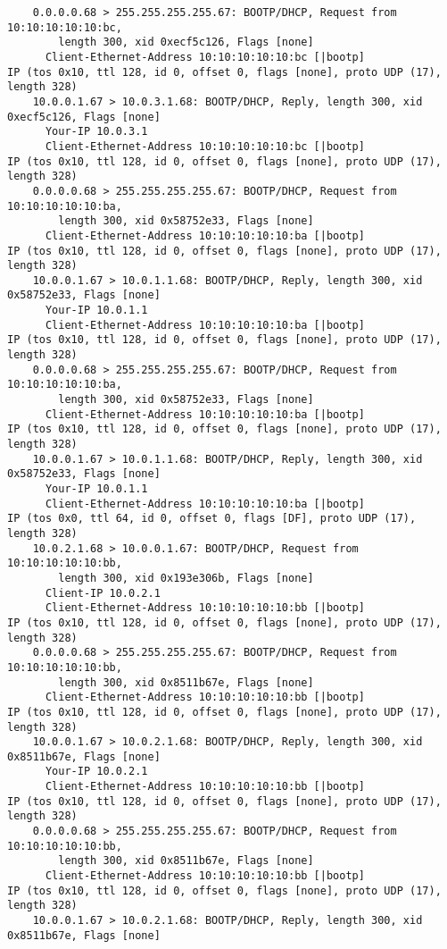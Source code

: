 \documentclass[a4paper,12pt]{article}
\begin{document}
\begin{Verbatim}
	0.0.0.0.68 > 255.255.255.255.67: BOOTP/DHCP, Request from 10:10:10:10:10:bc, 
		length 300, xid 0xecf5c126, Flags [none]
	  Client-Ethernet-Address 10:10:10:10:10:bc [|bootp]
IP (tos 0x10, ttl 128, id 0, offset 0, flags [none], proto UDP (17), length 328) 
	10.0.0.1.67 > 10.0.3.1.68: BOOTP/DHCP, Reply, length 300, xid 0xecf5c126, Flags [none]
	  Your-IP 10.0.3.1
	  Client-Ethernet-Address 10:10:10:10:10:bc [|bootp]
IP (tos 0x10, ttl 128, id 0, offset 0, flags [none], proto UDP (17), length 328) 
	0.0.0.0.68 > 255.255.255.255.67: BOOTP/DHCP, Request from 10:10:10:10:10:ba, 
		length 300, xid 0x58752e33, Flags [none]
	  Client-Ethernet-Address 10:10:10:10:10:ba [|bootp]
IP (tos 0x10, ttl 128, id 0, offset 0, flags [none], proto UDP (17), length 328) 
	10.0.0.1.67 > 10.0.1.1.68: BOOTP/DHCP, Reply, length 300, xid 0x58752e33, Flags [none]
	  Your-IP 10.0.1.1
	  Client-Ethernet-Address 10:10:10:10:10:ba [|bootp]
IP (tos 0x10, ttl 128, id 0, offset 0, flags [none], proto UDP (17), length 328) 
	0.0.0.0.68 > 255.255.255.255.67: BOOTP/DHCP, Request from 10:10:10:10:10:ba, 
		length 300, xid 0x58752e33, Flags [none]
	  Client-Ethernet-Address 10:10:10:10:10:ba [|bootp]
IP (tos 0x10, ttl 128, id 0, offset 0, flags [none], proto UDP (17), length 328) 
	10.0.0.1.67 > 10.0.1.1.68: BOOTP/DHCP, Reply, length 300, xid 0x58752e33, Flags [none]
	  Your-IP 10.0.1.1
	  Client-Ethernet-Address 10:10:10:10:10:ba [|bootp]
IP (tos 0x0, ttl 64, id 0, offset 0, flags [DF], proto UDP (17), length 328) 
	10.0.2.1.68 > 10.0.0.1.67: BOOTP/DHCP, Request from 10:10:10:10:10:bb, 
		length 300, xid 0x193e306b, Flags [none]
	  Client-IP 10.0.2.1
	  Client-Ethernet-Address 10:10:10:10:10:bb [|bootp]
IP (tos 0x10, ttl 128, id 0, offset 0, flags [none], proto UDP (17), length 328) 
	0.0.0.0.68 > 255.255.255.255.67: BOOTP/DHCP, Request from 10:10:10:10:10:bb, 
		length 300, xid 0x8511b67e, Flags [none]
	  Client-Ethernet-Address 10:10:10:10:10:bb [|bootp]
IP (tos 0x10, ttl 128, id 0, offset 0, flags [none], proto UDP (17), length 328) 
	10.0.0.1.67 > 10.0.2.1.68: BOOTP/DHCP, Reply, length 300, xid 0x8511b67e, Flags [none]
	  Your-IP 10.0.2.1
	  Client-Ethernet-Address 10:10:10:10:10:bb [|bootp]
IP (tos 0x10, ttl 128, id 0, offset 0, flags [none], proto UDP (17), length 328) 
	0.0.0.0.68 > 255.255.255.255.67: BOOTP/DHCP, Request from 10:10:10:10:10:bb, 
		length 300, xid 0x8511b67e, Flags [none]
	  Client-Ethernet-Address 10:10:10:10:10:bb [|bootp]
IP (tos 0x10, ttl 128, id 0, offset 0, flags [none], proto UDP (17), length 328) 
	10.0.0.1.67 > 10.0.2.1.68: BOOTP/DHCP, Reply, length 300, xid 0x8511b67e, Flags [none]

\end{Verbatim}
\end{document}
